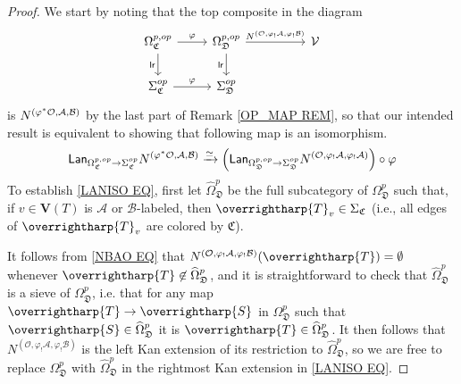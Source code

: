 \documentclass[a4paper,10pt
,draft
]{article}%
\numberwithin{equation}{section}
\numberwithin{figure}{section}
\theoremstyle{definition} %
\newcommand{\vect}[1]{\text{\overrightharp{\ensuremath{#1}}}}
\newcommand{\1}{\ensuremath{\mathbbm 1}}%
\begin{document}
\begin{proof}%
	
	We start by noting that the top composite in the diagram
	\[
	\begin{tikzcd}
	\Omega_{\mathfrak{C}}^{p,op} \ar{r}{\varphi} \ar{d}[swap]{\mathsf{lr}} &
	\Omega_{\mathfrak{D}}^{p,op} 
	\ar{rr}{N^{(\mathcal{O},\varphi_!\mathcal{A},\varphi_!\mathcal{B})}}
	\ar{d}[swap]{\mathsf{lr}} &&
	\mathcal{V}
	\\
	\Sigma_{\mathfrak{C}}^{op} \ar{r}{\varphi} &
	\Sigma_{\mathfrak{D}}^{op} 
	\end{tikzcd}
	\]
	is $N^{(\varphi^{\**}\mathcal{O},\mathcal{A},\mathcal{B})}$
	by the last part of Remark \ref{OP_MAP REM}, 
	so that our intended result is equivalent to showing that 
	following map is an isomorphism.
	\begin{equation}\label{LANISO EQ}
	\mathsf{Lan}_{\Omega_{\mathfrak{C}}^{p,op} \to \Sigma_{\mathfrak{C}}^{op}}
	N^{(\varphi^{\**}\mathcal{O},\mathcal{A},\mathcal{B})}
	\xrightarrow{\simeq}
	\left(
	\mathsf{Lan}_{\Omega_{\mathfrak{D}}^{p,op} \to \Sigma_{\mathfrak{D}}^{op}}
	N^{(\mathcal{O},\varphi_!\mathcal{A},\varphi_!\mathcal{A})}
	\right) \circ \varphi 
	\end{equation}
%
	To establish \eqref{LANISO EQ}, first let $\widehat{\Omega}^p_{\mathfrak{D}}$
	be the full subcategory of $\Omega^p_{\mathfrak{D}}$
	such that,
	if $v \in \boldsymbol{V}(T)$ is 
	$\mathcal{A}$ or $\mathcal{B}$-labeled,
	then $\vect{T}_v \in \Sigma_{\mathfrak C}$
	(i.e., all edges of $\vect{T}_v$ are colored by $\mathfrak{C}$).
	
	It follows from \eqref{NBAO EQ} that 
	$N^{(\mathcal{O}, \varphi_! \mathcal{A}, \varphi_! \mathcal{B})}(\vect{T}) =
	\emptyset$ whenever $\vect{T} \not \in \widehat{\Omega}^p_{\mathfrak{D}}$,
	and it is straightforward to check that 
	$\widehat{\Omega}^p_{\mathfrak{D}}$
	is a sieve of $\Omega^p_{\mathfrak{D}}$, 
	i.e. that for any map $\vect{T} \to \vect{S}$ 
	in $\Omega^p_{\mathfrak{D}}$ such that 
	$\vect{S} \in \widehat{\Omega}^p_{\mathfrak{D}}$ it is 
	$\vect{T} \in \widehat{\Omega}^p_{\mathfrak{D}}$.
	It then follows that 
	$N^{(\mathcal{O}, \varphi_! \mathcal{A}, \varphi_! \mathcal{B})}$
	is the left Kan extension of its restriction to 
	$\widehat{\Omega}^p_{\mathfrak{D}}$, 
	so we are free to replace
	$\Omega^p_{\mathfrak{D}}$
	with
	$\widehat{\Omega}^p_{\mathfrak{D}}$
	in the rightmost Kan extension in \eqref{LANISO EQ}.
	

\end{proof}
\end{document}
